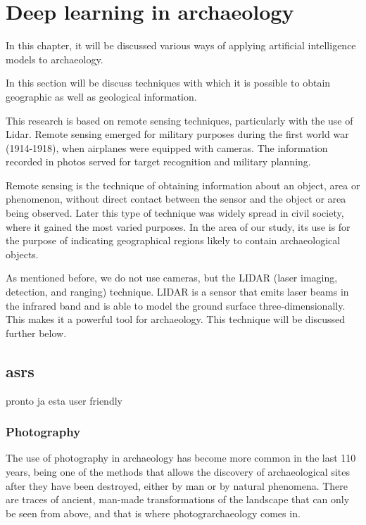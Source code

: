 

\chapter{Deep learning in archaeology}

\begin{introduction}
In this chapter, it will be discussed various ways of applying artificial intelligence models to archaeology.
\end{introduction}
In this section will be discuss techniques with which it is possible to obtain geographic as well as geological information. 

This research is based on remote sensing techniques, particularly with the use of Lidar. Remote sensing emerged for military purposes during the first world war (1914-1918), when airplanes were equipped with cameras. The information recorded in photos served for target recognition and military planning.

Remote sensing is the technique of obtaining information about an object, area or phenomenon, without direct contact between the sensor and the object or area being observed.
Later this type of technique was widely spread in civil society, where it gained the most varied purposes. In the area of our study, its use is for the purpose of indicating geographical regions likely to contain archaeological objects.

As mentioned before, we do not use cameras, but the LIDAR (laser imaging, detection, and ranging) technique. LIDAR is a sensor that emits laser beams in the infrared band and is able to model the ground surface three-dimensionally. This makes it a powerful tool for archaeology. This technique will be discussed further below.


\section{asrs}
pronto ja esta user friendly
\clearpage
\subsection{Photography}
The use of photography in archaeology has become more common in the last 110 years, being one of the methods that allows the discovery of archaeological sites after they have been destroyed, either by man or by natural phenomena. 
There are traces of ancient, man-made transformations of the landscape that can only be seen from above, and that is where photograrchaeology comes in.

